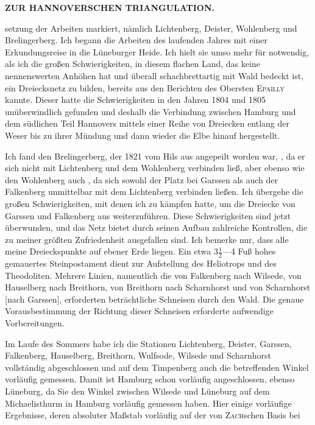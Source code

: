 \par\clearpage
\noindent{}\hfill{\small\textbf{ZUR HANNOVERSCHEN TRIANGULATION.}}\hfill\null\par\medskip
\noindent setzung der Arbeiten markiert, nämlich Lichtenberg, Deister, Wohlenberg und Brelingerberg. Ich begann die Arbeiten des laufenden Jahres mit einer Erkundungsreise in die Lüneburger Heide. Ich hielt sie umso mehr für notwendig, als ich die großen Schwierigkeiten, in diesem flachen Land, das keine nennenswerten Anhöhen hat und überall schachbrettartig mit Wald bedeckt ist, ein Dreiecksnetz zu bilden, bereits aus den Berichten des Obersten \textsc{Epailly} kannte. Dieser hatte die Schwierigkeiten in den Jahren 1804 und 1805 unüberwindlich gefunden und deshalb die Verbindung zwischen Hamburg und dem südlichen Teil Hannovers mittels einer Reihe von Dreiecken entlang der Weser bis zu ihrer Mündung und dann wieder die Elbe hinauf hergestellt.
\par\noindent\hspace*{\parindent}Ich fand den Brelingerberg, der 1821 vom Hils aus angepeilt worden war, , da er sich nicht mit Lichtenberg und dem Wohlenberg verbinden ließ, aber ebenso wie den Wohlenberg auch , da sich sowohl der Platz bei Garssen als auch der Falkenberg unmittelbar mit dem Lichtenberg verbinden ließen. Ich übergehe die großen Schwierigkeiten, mit denen ich zu kämpfen hatte, um die Dreiecke von Garssen und Falkenberg aus weiterzuführen. Diese Schwierigkeiten sind jetzt überwunden, und das Netz bietet durch seinen Aufbau zahlreiche Kontrollen, die zu meiner größten Zufriedenheit ausgefallen sind. Ich bemerke nur, dass alle meine Dreieckspunkte auf ebener Erde liegen. Ein etwa \(3\frac{1}{2}\)---4 Fuß hohes gemauertes Steinpostament dient zur Aufstellung des Heliotrops und des Theodoliten. Mehrere Linien, namentlich die von Falkenberg nach Wilsede, von Hauselberg nach Breithorn, von Breithorn nach Scharnhorst und von Scharnhorst [nach Garssen], erforderten beträchtliche Schneisen durch den Wald. Die genaue Vorausbestimmung der Richtung dieser Schneisen erforderte aufwendige Vorbereitungen.
\par\noindent\hspace*{\parindent}Im Laufe des Sommers habe ich die Stationen Lichtenberg, Deister, Garssen, Falkenberg, Hauselberg, Breithorn, Wulfsode, Wilsede und Scharnhorst vollständig abgeschlossen und auf dem Timpenberg auch die betreffenden Winkel vorläufig gemessen. Damit ist Hamburg schon vorläufig angeschlossen, ebenso Lüneburg, da Sie den Winkel zwischen Wilsede und Lüneburg auf dem Michaelisthurm in Hamburg vorläufig gemessen haben. Hier einige vorläufige Ergebnisse, deren absoluter Maßstab vorläufig auf der von \textsc{Zach}schen Basis bei

